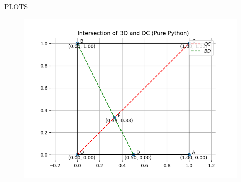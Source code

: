 \documentclass{beamer}
\begin{document}
\begin{frame}[fragile]{PLOTS}
\begin{figure}
    \centering
    \includegraphics[width=0.9\columnwidth]{figs/fig52.png}
    \caption{}
    \label{fig:placeholder}
\end{figure}
\end{frame}
\end{document}
